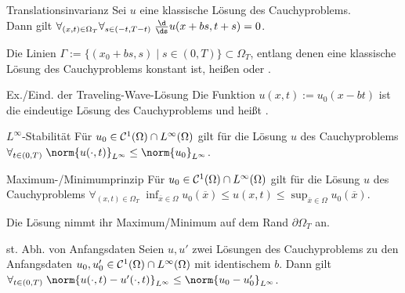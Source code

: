 \linie

\begin{Satz}{Translationsinvarianz}
    Sei $u$ eine klassische Lösung des Cauchyproblems.\\
    Dann gilt $\forall_{(x, t) \in \Omega_T} \forall_{s \in (-t, T-t)}\;
    \frac{\d}{\ds} u(x + bs, t + s) = 0$.
\end{Satz}

\begin{Bem}
    Die Linien $\Gamma := \{(x_0 + bs, s) \;|\; s \in (0, T)\} \subset \Omega_T$,
    entlang denen eine klassische Lösung des Cauchyproblems konstant ist,
    heißen  oder .
\end{Bem}

\begin{Satz}{Ex./Eind. der Traveling-Wave-Lösung}
    Die Funktion $u(x, t) := u_0(x - bt)$ ist die eindeutige Lösung des Cauchyproblems
    und heißt .
\end{Satz}

\linie

\begin{Satz}{$L^\infty$-Stabilität}
    Für $u_0 \in \mathcal{C}^1(\Omega) \cap L^\infty(\Omega)$ gilt für die Lösung $u$ des Cauchyproblems\\
    $\forall_{t \in (0, T)}\; \norm{u(\cdot, t)}_{L^\infty} \le \norm{u_0}_{L^\infty}$.
\end{Satz}

\begin{Satz}{Maximum-/Minimumprinzip}
    Für $u_0 \in \mathcal{C}^1(\Omega) \cap L^\infty(\Omega)$ gilt für die Lösung $u$ des Cauchyproblems
    $\forall_{(x, t) \in \Omega_T}\;
    \inf_{\overline{x} \in \Omega} u_0(\overline{x}) \le u(x, t) \le
    \sup_{\overline{x} \in \Omega} u_0(\overline{x})$.
\end{Satz}

\begin{Bem}
    Die Lösung nimmt ihr Maximum/Minimum auf dem Rand $\partial\Omega_T$ an.
\end{Bem}

\begin{Satz}{st. Abh. von Anfangsdaten}
    Seien $u, u'$ zwei Lösungen des Cauchyproblems zu den Anfangsdaten
    $u_0, u_0' \in \mathcal{C}^1(\Omega) \cap L^\infty(\Omega)$ mit identischem $b$.
    Dann gilt\\
    $\forall_{t \in (0, T)}\;
    \norm{u(\cdot, t) - u'(\cdot, t)}_{L^\infty} \le \norm{u_0 - u_0'}_{L^\infty}$.
\end{Satz}


